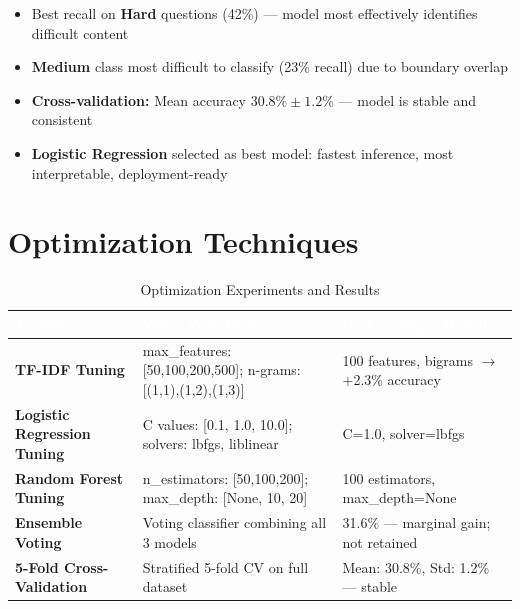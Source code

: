 \documentclass[12pt,a4paper]{article}
\begin{document}
\begin{itemize}[leftmargin=1.5em, itemsep=4pt]
  \item Best recall on \textbf{Hard} questions (42\%) --- model most effectively identifies difficult content
  \item \textbf{Medium} class most difficult to classify (23\% recall) due to boundary overlap
  \item \textbf{Cross-validation:} Mean accuracy $30.8\% \pm 1.2\%$ --- model is stable and consistent
  \item \textbf{Logistic Regression} selected as best model: fastest inference, most interpretable, deployment-ready
\end{itemize}

\section{Optimization Techniques}

\begin{table}[H]
\centering
\begin{tabular}{|L{3.5cm}|L{5cm}|L{4.5cm}|}
\hline
{}
\textcolor{white}{\textbf{Technique}} &
\textcolor{white}{\textbf{What Was Tested}} &
\textcolor{white}{\textbf{Best Config / Result}} \\
\hline
\textbf{TF-IDF Tuning} &
max\_features: [50,100,200,500]; n-grams: [(1,1),(1,2),(1,3)] &
\textcolor{successgreen}{100 features, bigrams $\rightarrow$ +2.3\% accuracy} \\
\hline
{}
\textbf{Logistic Regression Tuning} &
C values: [0.1, 1.0, 10.0]; solvers: lbfgs, liblinear &
\textcolor{successgreen}{C=1.0, solver=lbfgs} \\
\hline
\textbf{Random Forest Tuning} &
n\_estimators: [50,100,200]; max\_depth: [None, 10, 20] &
\textcolor{successgreen}{100 estimators, max\_depth=None} \\
\hline
{}
\textbf{Ensemble Voting} &
Voting classifier combining all 3 models &
\textcolor{warningred}{31.6\% --- marginal gain; not retained} \\
\hline
\textbf{5-Fold Cross-Validation} &
Stratified 5-fold CV on full dataset &
\textcolor{successgreen}{Mean: 30.8\%, Std: 1.2\% --- stable} \\
\hline
\end{tabular}
\caption{Optimization Experiments and Results}
\end{table}
\end{document}

